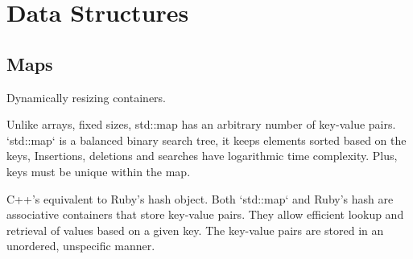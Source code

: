 

\chapter{Data Structures}

\section{Maps}

Dynamically resizing containers.

Unlike arrays, fixed sizes, std::map has an arbitrary number of key-value pairs.
`std::map` is a balanced binary search tree, it keeps elements sorted based on the keys, 
Insertions, deletions and searches have logarithmic time complexity.
Plus, keys must be unique within the map.

C++'s equivalent to Ruby's hash object. 
Both `std::map` and Ruby's hash are associative containers that store key-value pairs.
They allow efficient lookup and retrieval of values based on a given key.
The key-value pairs are stored in an unordered, unspecific manner.

